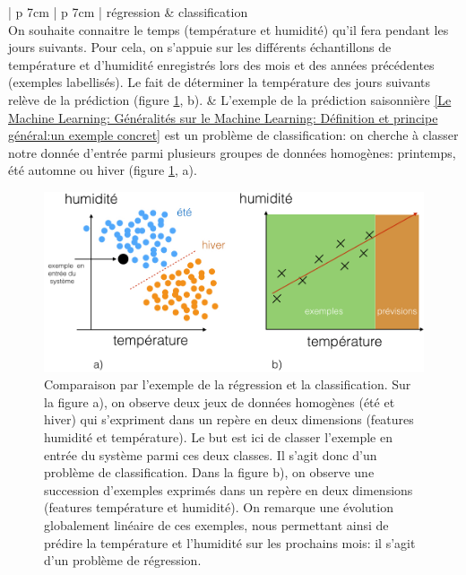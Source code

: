\begin{table}[H]
	\centering
	\begin{tabular}{ | p {7cm} | p {7cm} |}
		\hline
		régression & classification \\
		\hline
		On souhaite connaitre le temps (température et humidité) qu'il fera pendant les jours suivants. Pour cela, on s'appuie sur les différents échantillons de température et d'humidité enregistrés lors des mois et des années précédentes (exemples labellisés). Le fait de déterminer la température des jours suivants relève de la prédiction (figure \ref{fig:Comparaison par l'exemple de la régression et la classification}, b).  
		 &  L'exemple de la prédiction saisonnière \ref{Le Machine Learning: Généralités sur le Machine Learning: Définition et principe général:un exemple concret} est un problème de classification: on cherche à classer notre donnée d'entrée parmi plusieurs groupes de données homogènes: printemps, été automne ou hiver (figure \ref{fig:Comparaison par l'exemple de la régression et la classification}, a). \\
		\hline 
	\end{tabular}
	\caption[Comparaison des différentes catégories d'apprentissage supervisé]{Comparaison entre l'apprentissage supervisé de type régression et supervisé de type classification}
	\label {tab: Comparaison des différentes catégories d'apprentissage supervisé}
\end{table}

\begin{figure}[h]
	\centering\includegraphics[width=13cm]{images/regression_class.jpeg}
	\caption[Comparaison par l'exemple de la régression et de la classification]{Comparaison par l'exemple de la régression et la classification. Sur la figure a), on observe deux jeux de données homogènes (été et hiver) qui s'expriment dans un repère en deux dimensions (features humidité et température). Le but est ici de classer l'exemple en entrée du système parmi ces deux classes. Il s'agit donc d'un problème de classification. Dans la figure b), on observe une succession d'exemples exprimés dans un repère en deux dimensions (features température et humidité). On remarque une évolution globalement linéaire de ces exemples, nous permettant ainsi de prédire la température et l'humidité sur les prochains mois: il s'agit d'un problème de régression.}
	\label{fig:Comparaison par l'exemple de la régression et la classification}
\end{figure}





